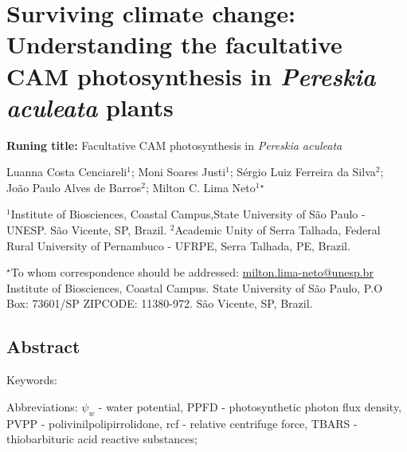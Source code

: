 \documentclass[
  12pt,
  letterpaper,
  DIV=11,
  numbers=noendperiod]{scrartcl}
\author{}
\date{}
\begin{document}
\ifdefined\Shaded\renewenvironment{Shaded}{\begin{tcolorbox}[enhanced, frame hidden, breakable, borderline west={3pt}{0pt}{shadecolor}, sharp corners, boxrule=0pt, interior hidden]}{\end{tcolorbox}}\fi

\hypertarget{surviving-climate-change-understanding-the-facultative-cam-photosynthesis-in-pereskia-aculeata-plants}{%
\section{\texorpdfstring{Surviving climate change: Understanding the
facultative CAM photosynthesis in \emph{Pereskia aculeata}
plants}{Surviving climate change: Understanding the facultative CAM photosynthesis in Pereskia aculeata plants}}\label{surviving-climate-change-understanding-the-facultative-cam-photosynthesis-in-pereskia-aculeata-plants}}

\textbf{Runing title:} Facultative CAM photosynthesis in \emph{Pereskia
aculeata}

Luanna Costa Cenciareli\({^1}\); Moni Soares Justi\({^1}\); Sérgio Luiz
Ferreira da Silva\({^2}\); João Paulo Alves de Barros\({^2}\); Milton C.
Lima Neto\({^1}{^\star}\)

\({^1}\)Institute of Biosciences, Coastal Campus,State University of São
Paulo - UNESP. São Vicente, SP, Brazil. \({^2}\)Academic Unity of Serra
Talhada, Federal Rural University of Pernambuco - UFRPE, Serra Talhada,
PE, Brazil.

\({^\star}\)To whom correspondence should be addressed:
\href{mailto:milton.lima-neto@unesp.br}{milton.lima-neto@unesp.br}
Institute of Biosciences, Coastal Campus. State University of São Paulo,
P.O Box: 73601/SP ZIPCODE: 11380-972. São Vicente, SP, Brazil.

\vspace{2mm}

\hypertarget{abstract}{%
\subsection{Abstract}\label{abstract}}

Keywords:

Abbreviations: \(\psi_w\) - water potential, PPFD - photosynthetic
photon flux density, PVPP - polivinilpolipirrolidone, rcf - relative
centrifuge force, TBARS - thiobarbituric acid reactive substances;

\newpage
\end{document}
